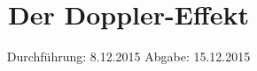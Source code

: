

\subject{VERSUCH NUMMER 104 (Korrektur)}
\title{Der Doppler-Effekt}
\date{
  Durchführung: 8.12.2015
  \hspace{3em}
  Abgabe: 15.12.2015
}



\maketitle
\thispagestyle{empty}
\tableofcontents
\newpage








\printbibliography



